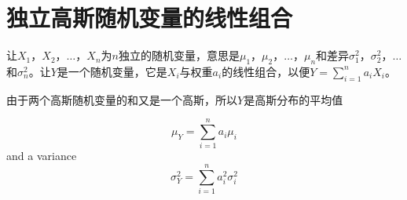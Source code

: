 

\section{独立高斯随机变量的线性组合}\label{sec:lcombrandom}
让$X_1$，$X_2$，$\ldots$，$X_n$为$n$独立的随机变量，意思是$\mu_1$，$\mu_2$，$\ldots$，$\mu_n$和差异$\sigma_1^2$，$\sigma_2^2$，$\ldots$和$\sigma^2_n$。让$Y$是一个随机变量，它是$X_i$与权重$a_i$的线性组合，以便$Y=\sum_{i=1}^na_iX_i$。

由于两个高斯随机变量的和又是一个高斯，所以$Y$是高斯分布的平均值

\begin{equation}
\mu_Y=\sum_{i=1}^na_i\mu_i
\end{equation}
and a variance
\begin{equation}
\sigma_Y^2=\sum_{i=1}^na_i^2\sigma_i^2
\end{equation}  



